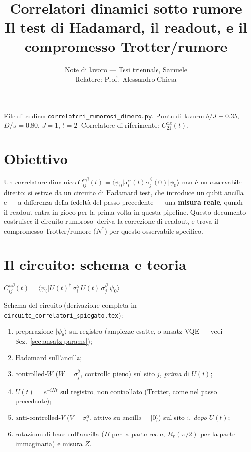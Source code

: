 \documentclass[11pt,a4paper]{article}
\title{\vspace{-1.5em}\color{inkblue}Correlatori dinamici sotto rumore\\[0.2em]
\Large\normalfont\color{softgray}Il test di Hadamard, il readout, e il compromesso Trotter/rumore}
\author{Note di lavoro --- Tesi triennale, Samuele\\ Relatore: Prof.\ Alessandro Chiesa}
\date{}
\newcommand{\ket}[1]{\lvert #1 \rangle}
\newcommand{\bra}[1]{\langle #1 \rvert}
\begin{document}
\sloppy
\maketitle
\thispagestyle{fancy}
\vspace{-2.0em}

File di codice: \texttt{correlatori\_rumorosi\_dimero.py}. Punto di
lavoro: $b/J=0.35$, $D/J=0.80$, $J=1$, $t=2$. Correlatore di
riferimento: $C_{21}^{xx}(t)$.

\tableofcontents

\section{Obiettivo}

Un correlatore dinamico $C_{ij}^{\alpha\beta}(t)=\bra{\psi_0}\sigma_i^\alpha(t)\sigma_j^\beta(0)\ket{\psi_0}$
non è un osservabile diretto: si estrae da un circuito di Hadamard test,
che introduce un qubit ancilla e --- a differenza della fedeltà del passo
precedente --- una \textbf{misura reale}, quindi il readout entra in gioco
per la prima volta in questa pipeline. Questo documento costruisce il
circuito rumoroso, deriva la correzione di readout, e trova il
compromesso Trotter/rumore ($N^*$) per questo osservabile specifico.

\section{Il circuito: schema e teoria}

\begin{keyeq}
\centering
$C_{ij}^{\alpha\beta}(t) = \bra{\psi_0}U(t)^\dagger\, \sigma_i^\alpha\, U(t)\, \sigma_j^\beta\ket{\psi_0}$
\end{keyeq}
Schema del circuito (derivazione completa in
\texttt{circuito\_correlatori\_spiegato.tex}):
\begin{enumerate}[leftmargin=1.4em,itemsep=0.15em]
\item preparazione $\ket{\psi_0}$ sul registro (ampiezze esatte, o ansatz
VQE --- vedi Sez.~\ref{sec:ansatz-params});
\item Hadamard sull'ancilla;
\item controlled-$W$ ($W=\sigma_j^\beta$, controllo pieno) sul sito $j$,
\emph{prima} di $U(t)$;
\item $U(t)=e^{-iHt}$ sul registro, non controllato (Trotter, come nel
passo precedente);
\item anti-controlled-$V$ ($V=\sigma_i^\alpha$, attivo su ancilla$=\ket0$)
sul sito $i$, \emph{dopo} $U(t)$;
\item rotazione di base sull'ancilla ($H$ per la parte reale,
$R_x(\pi/2)$ per la parte immaginaria) e misura $Z$.
\end{enumerate}
\end{document}
